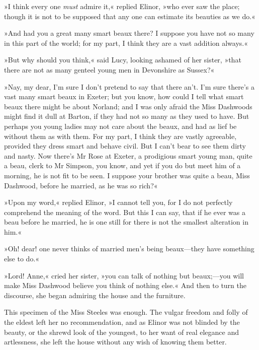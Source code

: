 »I think every one \textit{must} admire it,« replied Elinor, »who ever saw the place; though it is not to be supposed that any one can estimate its beauties as we do.«

»And had you a great many smart beaux there? I suppose you have not so many in this part of the world; for my part, I think they are a vast addition always.«

»But why should you think,« said Lucy, looking ashamed of her sister, »that there are not as many genteel young men in Devonshire as Sussex?«

»Nay, my dear, I’m sure I don’t pretend to say that there an’t. I’m sure there’s a vast many smart beaux in Exeter; but you know, how could I tell what smart beaux there might be about Norland; and I was only afraid the Miss Dashwoods might find it dull at Barton, if they had not so many as they used to have. But perhaps you young ladies may not care about the beaux, and had as lief be without them as with them. For my part, I think they are vastly agreeable, provided they dress smart and behave civil. But I can’t bear to see them dirty and nasty. Now there’s Mr Rose at Exeter, a prodigious smart young man, quite a beau, clerk to Mr Simpson, you know, and yet if you do but meet him of a morning, he is not fit to be seen. I suppose your brother was quite a beau, Miss Dashwood, before he married, as he was so rich?«

»Upon my word,« replied Elinor, »I cannot tell you, for I do not perfectly comprehend the meaning of the word. But this I can say, that if he ever was a beau before he married, he is one still for there is not the smallest alteration in him.«

»Oh! dear! one never thinks of married men’s being beaux—they have something else to do.«

»Lord! Anne,« cried her sister, »you can talk of nothing but beaux;—you will make Miss Dashwood believe you think of nothing else.« And then to turn the discourse, she began admiring the house and the furniture.

This specimen of the Miss Steeles was enough. The vulgar freedom and folly of the eldest left her no recommendation, and as Elinor was not blinded by the beauty, or the shrewd look of the youngest, to her want of real elegance and artlessness, she left the house without any wish of knowing them better.

